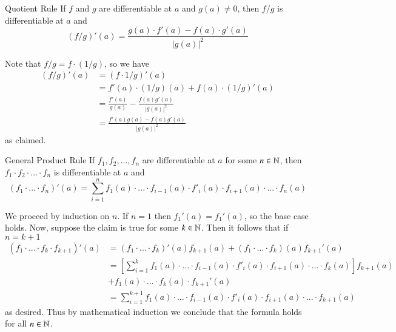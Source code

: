 \documentclass[12pt]{report}
\begin{document}
\begin{thm}{Quotient Rule}{}
    If $f$ and $g$ are differentiable at $a$ and $g(a) \neq 0$, then $f/g$ is differentiable at $a$ and $$(f/g)'(a) = \frac{g(a)\cdot f'(a) - f(a) \cdot g'(a)}{|g(a)|^2}$$
\end{thm}
\begin{proof*}{}{}
    Note that $f/g = f\cdot (1/g)$, so we have \begin{align*}
        (f/g)'(a) &= (f\cdot 1/g)'(a) \\
        &= f'(a)\cdot(1/g)(a) + f(a)\cdot(1/g)'(a) \tag{Product Rule}\\
        &= \frac{f'(a)}{g(a)} -\frac{f(a)g'(a)}{|g(a)|^2} \tag{Quotient Derivative}\\
        &= \frac{f'(a)g(a) - f(a)g'(a)}{|g(a)|^2}
    \end{align*}
    as claimed.
\end{proof*}

\begin{thm}{General Product Rule}{}
    If $f_1,f_2,...,f_n$ are differentiable at $a$ for some $n \in \mathbb N$, then $f_1\cdot f_2\cdot ...\cdot f_n$ is differentiable at $a$ and $$(f_1\cdot...\cdot f_n)'(a) = \sum\limits_{i=1}^nf_1(a)\cdot...\cdot f_{i-1}(a)\cdot f'_i(a)\cdot f_{i+1}(a)\cdot...\cdot f_n(a)$$
\end{thm}
\begin{proof*}{}{}
    We proceed by induction on $n$. If $n = 1$ then $f_1'(a) = f_1'(a)$, so the base case holds. Now, suppose the claim is true for some $k \in \mathbb N$. Then it follows that if $n = k+1$ \begin{align*}
        (f_1\cdot ... \cdot f_k\cdot f_{k+1})'(a) &= (f_1\cdot ...\cdot f_k)'(a)f_{k+1}(a) + (f_1\cdot...\cdot f_k)(a)f_{k+1}'(a) \tag{Product Rule} \\
        &= \left[\sum\limits_{i=1}^kf_1(a)\cdot...\cdot f_{i-1}(a)\cdot f'_i(a)\cdot f_{i+1}(a)\cdot...\cdot f_k(a)\right]f_{k+1}(a)\\
        &+ f_1(a)\cdot ... \cdot f_k(a)\cdot f_{k+1}'(a) \tag{by Induction Hypothesis} \\
        &= \sum\limits_{i=1}^{k+1}f_1(a)\cdot...\cdot f_{i-1}(a)\cdot f'_i(a)\cdot f_{i+1}(a)\cdot...\cdot f_{k+1}(a)
    \end{align*}
    as desired. Thus by mathematical induction we conclude that the formula holds for all $n \in \mathbb N$.
\end{proof*}
\end{document}

